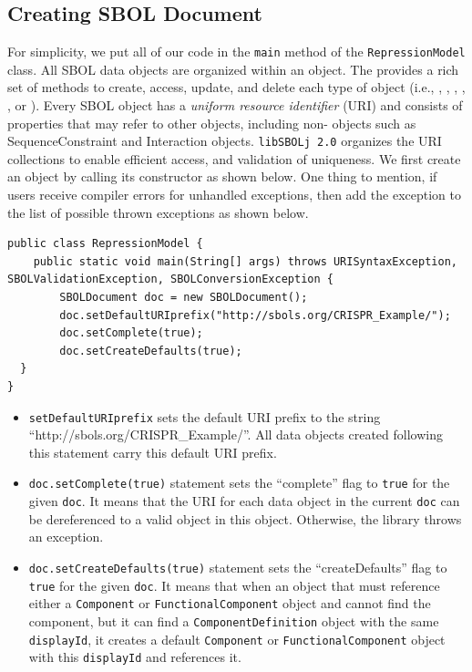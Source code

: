 \subsection*{Creating SBOL Document}
For simplicity, we put all of our code in the \lstinline+main+ method of the \lstinline+RepressionModel+ class. All SBOL data objects are organized within an  object. The  provides a rich set of methods to create, access, update, and delete each type of  object (i.e., , , , , , or ). Every SBOL object has a \emph{uniform resource identifier} (URI) and consists of properties that may refer to other objects, including non- objects such as SequenceConstraint and Interaction objects. \texttt{libSBOLj 2.0} organizes the URI collections to enable efficient access, and validation of uniqueness. We first create an  object by calling its constructor as shown below. One thing to mention, if users receive compiler errors for unhandled exceptions, then add the exception to the list of possible thrown exceptions as shown below. 

\begin{minipage}{0.95\textwidth} 
\begin{lstlisting}
public class RepressionModel {
	public static void main(String[] args) throws URISyntaxException, SBOLValidationException, SBOLConversionException {
		SBOLDocument doc = new SBOLDocument();
		doc.setDefaultURIprefix("http://sbols.org/CRISPR_Example/");
		doc.setComplete(true);
		doc.setCreateDefaults(true);
  }
}
\end{lstlisting}
\end{minipage}

\begin{itemize}
\item \lstinline+setDefaultURIprefix+ sets the
default URI prefix to the string ``http://sbols.org/CRISPR\_Example/''. All data objects created following this statement carry this default URI prefix.
\item \lstinline+doc.setComplete(true)+ statement sets the ``complete'' flag to \lstinline+true+ for the given \lstinline+doc+. It means that the URI for each data object in the current \lstinline+doc+ can be dereferenced to a valid object in this  object. Otherwise, the library throws an exception. 

\item \lstinline+doc.setCreateDefaults(true)+ statement
sets the ``createDefaults'' flag to \lstinline+true+ for the given
\lstinline+doc+.  It means that when an object that must
reference either a \lstinline+Component+ or \lstinline+FunctionalComponent+ object and cannot find the component, but it can find a \lstinline+ComponentDefinition+ object
with the same \lstinline+displayId+, it creates a default \lstinline+Component+ or \lstinline+FunctionalComponent+ object with this \lstinline+displayId+ and references it.

\end{itemize}

